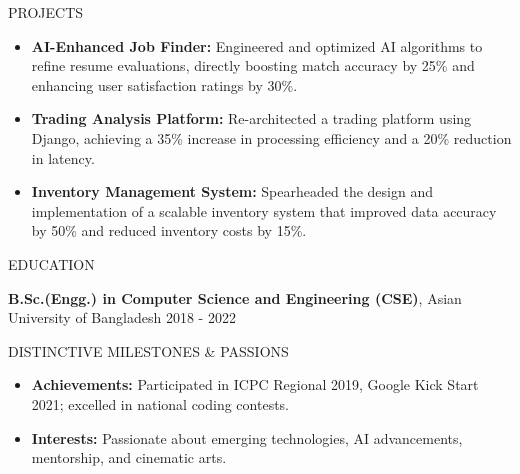 \documentclass{resume} %
\begin{document}
\begin{rSection}{PROJECTS}

\begin{itemize}
    \item \textbf{AI-Enhanced Job Finder:} Engineered and optimized AI algorithms to refine resume evaluations, directly boosting match accuracy by 25\% and enhancing user satisfaction ratings by 30\%.
    \item \textbf{Trading Analysis Platform:} Re-architected a trading platform using Django, achieving a 35\% increase in processing efficiency and a 20\% reduction in latency.
    \item \textbf{Inventory Management System:} Spearheaded the design and implementation of a scalable inventory system that improved data accuracy by 50\% and reduced inventory costs by 15\%.
\end{itemize}

\end{rSection} 


\begin{rSection}{EDUCATION}

{\bf B.Sc.(Engg.) in Computer Science and Engineering (CSE)}, Asian University of Bangladesh \hfill {2018 - 2022}

\end{rSection}


\begin{rSection}{DISTINCTIVE MILESTONES \& PASSIONS} 

\begin{itemize} 
    \item \textbf{Achievements:} Participated in ICPC Regional 2019, Google Kick Start 2021; excelled in national coding contests.
    \item \textbf{Interests:} Passionate about emerging technologies, AI advancements, mentorship, and cinematic arts.
\end{itemize}

\end{rSection}
\end{document}
